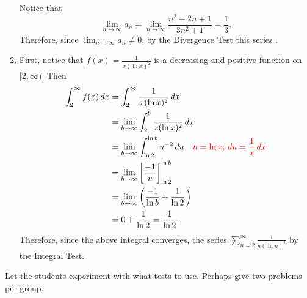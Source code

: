 \documentclass[]{ximera}
\begin{document}
\begin{problem}
\begin{freeResponse}
\begin{enumerate}
		Notice that
			\[
			\lim_{n \to \infty} a_n = \lim_{n \to \infty} \frac{n^2 + 2n + 1}{3n^2 +1} = \frac{1}{3}.
			\]
		Therefore, since $\lim_{n \to \infty} a_n \neq 0$, by the Divergence Test this series .
		
		
	
		\item  {}
		
		First, notice that $f(x) = \frac{1}{x (\ln x)^2}$ is a decreasing and positive function on $[2,\infty)$.
		Then
			\begin{align*}
			\int_2^\infty f(x) \d x 
			&= \int_2^\infty \frac{1}{x (\ln x)^2} \d x  \\
			&= \lim_{b \to \infty} \int_2^b \frac{1}{x (\ln x)^2} \d x  \\
			&= \lim_{b \to \infty} \int_{\ln 2}^{\ln b} u^{-2} \d u  \quad  {\color{red} u = \ln x, \d u = \frac{1}{x} \d x}  \\
			&= \lim_{b \to \infty} \eval{\frac{-1}{u}}_{\ln 2}^{\ln b}  \\
			&= \lim_{b \to \infty} \left( \frac{-1}{\ln b} + \frac{1}{\ln 2} \right)  \\
			&= 0 + \frac{1}{\ln 2} = \frac{1}{\ln 2}.
			\end{align*}
		Therefore, since the above integral converges, the series $\sum_{n=2}^\infty \frac{1}{n(\ln n)^2}$  by the Integral Test.
	
		\end{enumerate}
	\end{freeResponse}
	
\end{problem}

\begin{instructorNotes}
Let the students experiment with what tests to use.  
Perhaps give two problems per group.
\end{instructorNotes}
\end{document}
